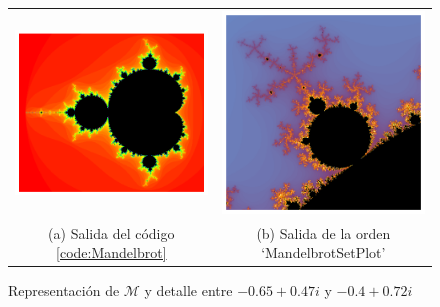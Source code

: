 \begin{figure}[ht]
  \centering
  \begin{tabular}{cc}
    \includegraphics[scale=0.54]{./img/C3/Mandelbrot-Mathematica.png} &   \includegraphics[scale=0.46]{./img/C3/MandelbrotSetPlot.png} \\
  (a) Salida del código \ref{code:Mandelbrot}  & (b) Salida de la orden `MandelbrotSetPlot' \\[6pt]
  \end{tabular}
  \caption{Representación de $\mathcal{M}$ y detalle entre $-0.65+0.47i$ y $-0.4+0.72i$}
  \label{fig:Mandelbrot-explicado}
\end{figure}

